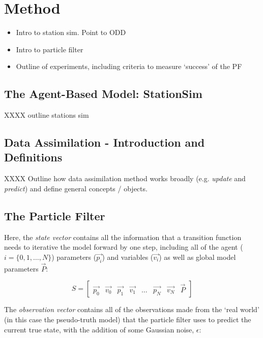 \section{Method\label{Method}}

\begin{itemize}
\item Intro to station sim. Point to ODD
\item Intro to particle filter
\item Outline of experiments, including criteria to measure `success' of the PF
\end{itemize}

\subsection{The Agent-Based Model: StationSim}

XXXX outline stations sim


\subsection{Data Assimilation - Introduction and Definitions}

XXXX Outline how data assimilation method works broadly (e.g. \textit{update} and \textit{predict}) and define general concepts / objects.


\subsection{The Particle Filter}

Here, the \textit{state vector} contains all the information that a transition function needs to iterative the model forward by one step, including all of the agent ($i = \{ 0, 1, \dots, N \} $) parameters ($\overrightarrow{p_i}$) and variables ($\overrightarrow{v_i}$) as well as global model parameters $\overrightarrow{P}$:

\begin{equation}
  S  = \left[ \begin{array}{cccccccc}
\overrightarrow{p_0} & \overrightarrow{v_0} & \overrightarrow{p_1} &  \overrightarrow{v_1} &  \dots &  \overrightarrow{p_N} &  \overrightarrow{v_N} & \overrightarrow{P} 
\end{array} \right]
\end{equation} 

The \textit{observation vector} contains all of the observations made from the `real world' (in this case the pseudo-truth model) that the particle filter uses to predict the current true state, with the addition of some Gaussian noise, $\epsilon$:

